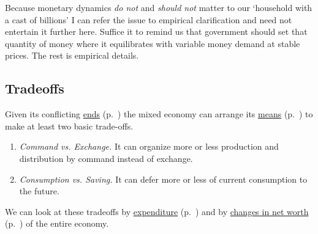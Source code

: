 Because monetary dynamics \emph{do not} and \emph{should not} matter to our `household with a cast of billions' I can refer the issue to empirical clarification and need not entertain it further here. Suffice it to remind us that government should set that quantity of money where it equilibrates with variable money demand at stable prices. The rest is empirical details.

\subsection[Tradeoffs]{Tradeoffs} \label{sec:tradeoffs} Given its conflicting \hyperref[sec:ends]{ends} (p.~\pageref{sec:ends}) the mixed economy can arrange its \hyperref[sec:means]{means} (p.~\pageref{sec:means}) to make at least two basic trade-offs. 
\begin{enumerate}
	\item \emph{Command vs. Exchange.} It can organize more or less production and distribution by command instead of exchange. 
	\item \emph{Consumption vs. Saving.} It can defer more or less of current consumption to the future. 
\end{enumerate}	
	
We can look at these tradeoffs by \hyperref[sec:byexpenditure]{expenditure} (p.~\pageref{sec:byexpenditure}) and by \hyperref[sec:deltanetworth]{changes in net worth} (p.~\pageref{sec:deltanetworth}) of the entire economy. 

